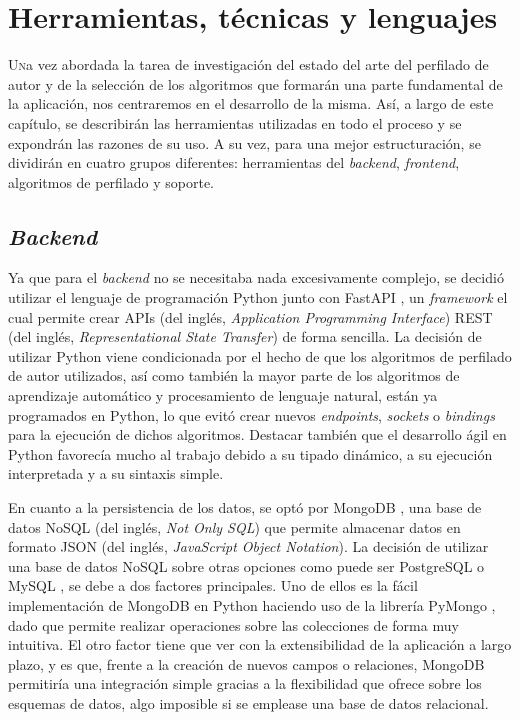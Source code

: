 \chapter{Herramientas, técnicas y lenguajes}
\label{chap:herramientas}

\lettrine{U}na vez abordada la tarea de investigación del estado del arte del perfilado de autor y de la selección
de los algoritmos que formarán una parte fundamental de la aplicación, nos centraremos
en el desarrollo de la misma.
Así, a largo de este capítulo, se describirán las herramientas utilizadas en todo el proceso y se expondrán las
razones de su uso. A su vez, para una mejor estructuración, se dividirán en cuatro grupos diferentes:
herramientas del \textit{backend}, \textit{frontend}, algoritmos de perfilado y soporte.

\section{\textit{Backend}}
\label{sec:herramientas_backend}

Ya que para el \textit{backend} no se necesitaba nada excesivamente complejo, se decidió utilizar el lenguaje de programación Python \cite{python} junto
con FastAPI \cite{fastapi}, un \textit{framework} el cual permite crear APIs (del inglés, \textit{Application Programming Interface})
REST (del inglés, \textit{Representational State Transfer}) de forma sencilla. La decisión de utilizar Python viene
condicionada por el hecho de que los algoritmos de perfilado de autor utilizados, así como también la mayor parte de los algoritmos de aprendizaje automático
y procesamiento de lenguaje natural,
están ya programados en Python, lo que evitó crear nuevos \textit{endpoints}, \textit{sockets} o \textit{bindings} para la ejecución de dichos algoritmos.
Destacar también que el desarrollo ágil en Python favorecía mucho al trabajo debido a su tipado dinámico, a su ejecución interpretada y a su sintaxis simple.

\bigskip
En cuanto a la persistencia de los datos, se optó por MongoDB \cite{mongodb}, una base de datos NoSQL (del inglés, \textit{Not Only SQL}) que permite almacenar
datos en formato JSON (del inglés, \textit{JavaScript Object Notation}). La decisión de utilizar una base de datos NoSQL sobre otras opciones como puede ser
PostgreSQL \cite{postgresql} o MySQL \cite{mysql}, se debe a dos factores principales. Uno de ellos es la fácil implementación de MongoDB en Python
haciendo uso de la librería PyMongo \cite{pymongo}, dado que permite realizar operaciones sobre las colecciones de forma muy intuitiva.
El otro factor tiene que ver con la extensibilidad de la aplicación a largo plazo, y es que, frente a la creación de nuevos
campos o relaciones, MongoDB permitiría una integración simple gracias a la flexibilidad que ofrece sobre los esquemas de datos, algo imposible
si se emplease una base de datos relacional.

